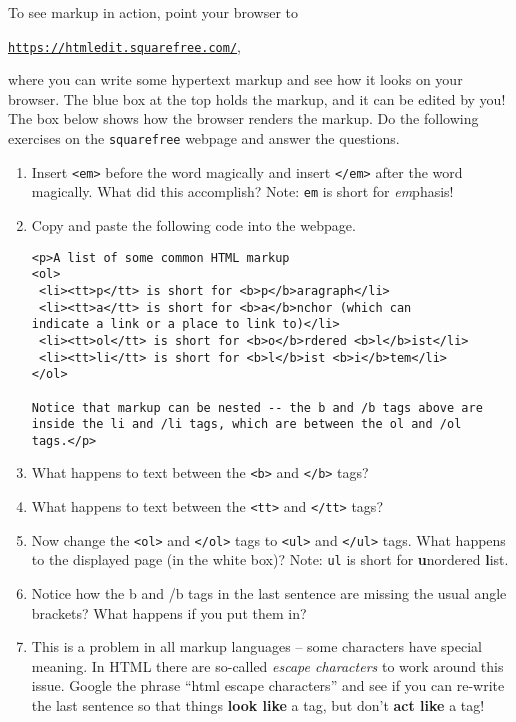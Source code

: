 To see markup in action, point your browser to 

\centerline{ \texttt{\href{https://htmledit.squarefree.com/}{https://htmledit.squarefree.com/}}, }

\noindent where you can write some hypertext markup and see how it looks on
your browser. The blue box at the top holds the markup, and it can
be edited by you! The box below shows how the browser renders the
markup. Do the following exercises on the \texttt{squarefree} webpage
and answer the questions.
\begin{enumerate}
\item Insert \texttt{<em>} before the word magically and insert \texttt{</em>}
after the word magically. What did this accomplish? Note: \texttt{em}
is short for \textit{em}phasis!
\item Copy and paste the following code into the webpage.

\begin{verbatim}
<p>A list of some common HTML markup
<ol>
 <li><tt>p</tt> is short for <b>p</b>aragraph</li>
 <li><tt>a</tt> is short for <b>a</b>nchor (which can
indicate a link or a place to link to)</li>
 <li><tt>ol</tt> is short for <b>o</b>rdered <b>l</b>ist</li>
 <li><tt>li</tt> is short for <b>l</b>ist <b>i</b>tem</li>
</ol>

Notice that markup can be nested -- the b and /b tags above are
inside the li and /li tags, which are between the ol and /ol
tags.</p>
\end{verbatim}


\item What happens to text between the \texttt{<b>} and \texttt{</b>} tags?
\item What happens to text between the \texttt{<tt>} and \texttt{</tt>}
tags?


\item Now change the \texttt{<ol>} and \texttt{</ol>} tags to \texttt{<ul>}
and \texttt{</ul>} tags. What happens to the displayed page (in the
white box)? Note: \texttt{ul} is short for \textbf{u}nordered \textbf{l}ist.

\item Notice how the b and /b tags in the last sentence are missing the usual angle brackets?  What happens if you put them in?
\item This is a problem in all markup languages -- some characters have special meaning.  In HTML there are so-called {\em escape characters} to work around this issue.  Google the phrase ``html escape characters'' and see if you can re-write the last sentence so that things {\bf look like} a tag, but don't {\bf act like} a tag!
\end{enumerate}